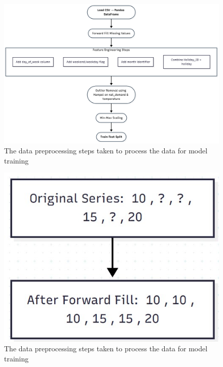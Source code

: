 \appendix
\begin{figure}[htbp]
	\centering %
	\includegraphics[scale=0]{images/data_preprocessing_steps.png}
	\caption{The data preprocessing steps taken to process the data for model training}
	\label{fig:preprocessing_steps_flowchart} %
\end{figure}
\begin{figure}[htbp]
	\centering %
	\includegraphics[scale=0.5]{images/forward_fill.jpg}
	\caption{The data preprocessing steps taken to process the data for model training}
	\label{fig:forward_fill} %
\end{figure}
